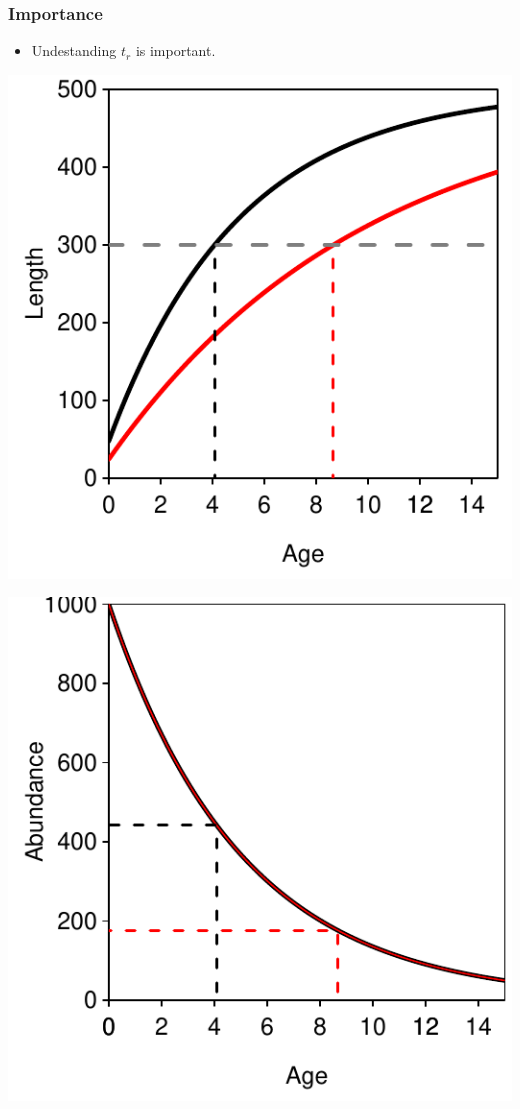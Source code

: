 \documentclass[xcolor=dvipsnames]{beamer}\usepackage[]{graphicx}\usepackage[]{color}
\newenvironment{knitrout}{}{} %
\begin{document}
\begin{frame}[fragile, t]
\frametitle{Importance}
\begin{itemize}
  \item Undestanding $t_{r}$ is important.
  \pause
  \bigskip
\end{itemize}

\hspace*{-1cm}
\begin{minipage}{0.7\textwidth}
\begin{knitrout}\footnotesize
{}\color{fgcolor}

{\centering \includegraphics[width=.5\linewidth]{Figs/unnamed-chunk-1-1} 

}



\end{knitrout}
\end{minipage}%
\pause
\hspace*{-3cm}
\begin{minipage}{0.7\textwidth}
\begin{knitrout}\footnotesize
{}\color{fgcolor}

{\centering \includegraphics[width=.5\linewidth]{Figs/unnamed-chunk-2-1} 

}



\end{knitrout}
\end{minipage}
\end{frame}
\end{document}
